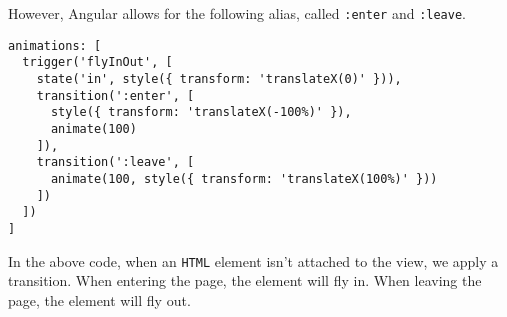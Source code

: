 However, Angular allows for the following alias, called \lstinline{:enter} and
\lstinline{:leave}. 

\begin{lstlisting}
animations: [
  trigger('flyInOut', [
    state('in', style({ transform: 'translateX(0)' })),
    transition(':enter', [
      style({ transform: 'translateX(-100%)' }),
      animate(100)
    ]),
    transition(':leave', [
      animate(100, style({ transform: 'translateX(100%)' }))
    ])
  ])
]
\end{lstlisting}

In the above code, when an \lstinline{HTML} element isn't attached to the view, 
we apply a transition. When entering the page, the element will fly in. When 
leaving the page, the element will fly out. 